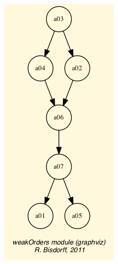 \documentclass[letterpaper,10pt,english]{sphinxmanual}
\begin{document}
\begin{fulllineitems}
\includegraphics{weakOrdering.png}


\end{fulllineitems}
\end{document}
